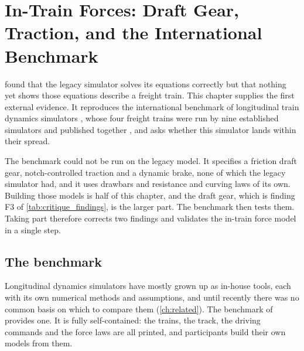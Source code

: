 \chapter{In-Train Forces: Draft Gear, Traction, and the International Benchmark}
\label{ch:benchmark}


 found that the legacy simulator solves its equations correctly but that nothing yet shows those equations describe a freight train. This chapter supplies the first external evidence. It reproduces the international benchmark of longitudinal train dynamics simulators \cite{Spiryagin2017BenchmarkQuestions}, whose four freight trains were run by nine established simulators and published together \cite{Wu2018BenchmarkResults}, and asks whether this simulator lands within their spread.

The benchmark could not be run on the legacy model. It specifies a friction draft gear, notch-controlled traction and a dynamic brake, none of which the legacy simulator had, and it uses drawbars and resistance and curving laws of its own. Building those models is half of this chapter, and the draft gear, which is finding F3 of \cref{tab:critique_findings}, is the larger part. The benchmark then tests them. Taking part therefore corrects two findings and validates the in-train force model in a single step.

\section{The benchmark}
\label{sec:bench_spec}

Longitudinal dynamics simulators have mostly grown up as in-house tools, each with its own numerical methods and assumptions, and until recently there was no common basis on which to compare them (\cref{ch:related}). The benchmark of \cite{Spiryagin2017BenchmarkQuestions} provides one. It is fully self-contained: the trains, the track, the driving commands and the force laws are all printed, and participants build their own models from them.

